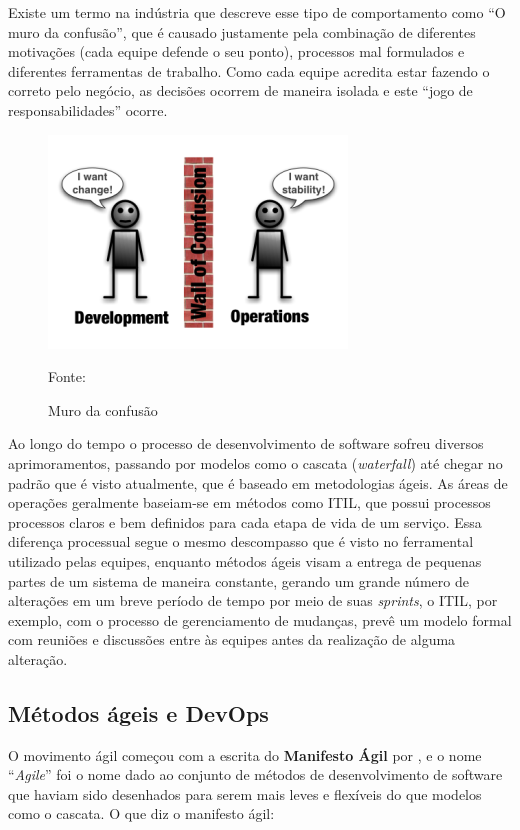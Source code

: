 \documentclass[twoside,english,brazilian]{UNISINOSartigo}
\newcommand{\source}[1]{\caption*{Fonte: {#1}} }
\begin{document}
Existe um termo na indústria que descreve esse tipo de comportamento como ``O muro da confusão'', que é causado justamente pela combinação de diferentes motivações (cada equipe defende o seu ponto), processos mal formulados e diferentes ferramentas de trabalho. Como cada equipe acredita estar fazendo o correto pelo negócio, as decisões ocorrem de maneira isolada e este ``jogo de responsabilidades'' ocorre.

\begin{figure}[h!]
    \centering
        \caption{Muro da confusão}
    \includegraphics[scale=.6]{imagens/WallOfConfusion.png}
    \source{}
    \label{fig:Muro da confusão}
    \end{figure}

Ao longo do tempo o processo de desenvolvimento de software sofreu diversos aprimoramentos, passando por modelos como o cascata (\textit{waterfall}) até chegar no padrão que é visto atualmente, que é baseado em metodologias ágeis. As áreas de operações geralmente baseiam-se em métodos como ITIL, que possui processos processos claros e bem definidos para cada etapa de vida de um serviço. Essa diferença processual segue o mesmo descompasso que é visto no ferramental utilizado pelas equipes, enquanto métodos ágeis visam a entrega de pequenas partes de um sistema de maneira constante, gerando um grande número de alterações em um breve período de tempo por meio de suas \textit{sprints}, o ITIL, por exemplo, com o processo de gerenciamento de mudanças, prevê um modelo formal com reuniões e discussões entre às equipes antes da realização de alguma alteração. 

\subsection{Métodos ágeis e DevOps}
O movimento ágil começou com a escrita do \textbf{Manifesto Ágil} por , e o nome ``\textit{Agile}'' foi o nome dado ao conjunto de métodos de desenvolvimento de software que haviam sido desenhados para serem mais leves e flexíveis do que modelos como o cascata.
O que diz o manifesto ágil:  \newline
\end{document}
